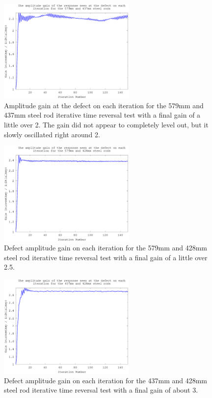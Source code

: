 \begin{figure}[ht!]
\centering
\includegraphics[width=0.6\textwidth]{eps_pics/steel-1-2_iterationVsGain.eps}
\caption{Amplitude gain at the defect on each iteration for the 579mm and 437mm steel rod iterative time reversal test with a final gain of a little over 2. The gain did not appear to completely level out, but it slowly oscillated right around 2.
	 \label{fig:steelIter1}} 
\end{figure}
  
\begin{figure}[ht!]
\centering
\includegraphics[width=0.6\textwidth]{eps_pics/steel-1-3_iterationVsGain.eps}
\caption{Defect amplitude gain on each iteration for the 579mm and 428mm steel rod iterative time reversal test with a final gain of a little over 2.5.
 	 \label{fig:steelIter2}} 
\end{figure}

\begin{figure}[ht!]
\centering
\includegraphics[width=0.6\textwidth]{eps_pics/steel-2-3_iterationVsGain.eps}
\caption{Defect amplitude gain on each iteration for the 437mm and 428mm steel rod iterative time reversal test with a final gain of about 3.
  	 \label{fig:steelIter3}} 
\end{figure}


